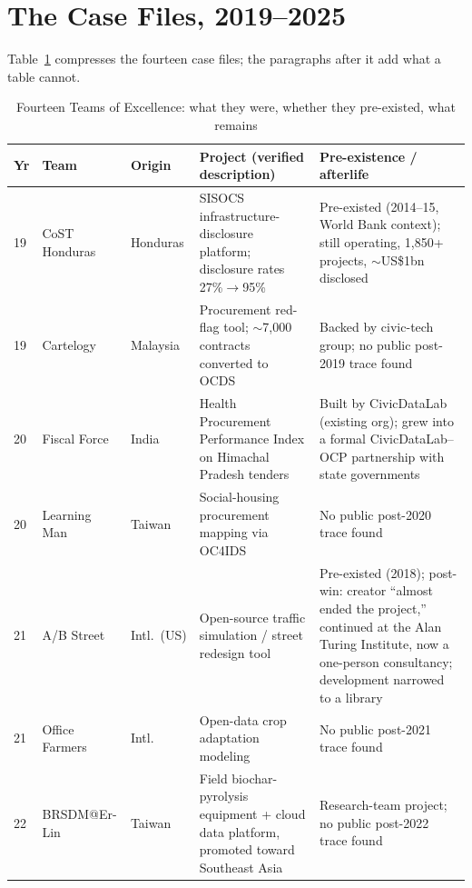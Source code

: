 \section{The Case Files, 2019--2025}\label{sec:cases}

Table~\ref{tab:master} compresses the fourteen case files; the paragraphs
after it add what a table cannot.

\begin{table}[htbp]
\caption{Fourteen Teams of Excellence: what they were, whether they pre-existed, what remains}
\label{tab:master}
\footnotesize
\begin{tabularx}{\textwidth}{@{}p{}p{}p{}Xp{}@{}}
\toprule
\textbf{Yr} & \textbf{Team} & \textbf{Origin} & \textbf{Project (verified description)} & \textbf{Pre-existence / afterlife} \\
\midrule
19 & CoST Honduras & Honduras & SISOCS infrastructure-disclosure platform; disclosure rates 27\%$\to$95\%\cite{cost} & Pre-existed (2014--15, World Bank context); still operating, 1,850+ projects, $\sim$US\$1bn disclosed\cite{cost} \\
19 & Cartelogy & Malaysia & Procurement red-flag tool; $\sim$7,000 contracts converted to OCDS\cite{ocpcartel} & Backed by civic-tech group; no public post-2019 trace found \\
20 & Fiscal Force & India & Health Procurement Performance Index on Himachal Pradesh tenders\cite{ocpfiscal} & Built by CivicDataLab (existing org); grew into a formal CivicDataLab--OCP partnership with state governments\cite{ocpindia} \\
20 & Learning Man & Taiwan & Social-housing procurement mapping via OC4IDS\cite{ocpfiscal} & No public post-2020 trace found \\
21 & A/B Street & Intl.\ (US) & Open-source traffic simulation / street redesign tool\cite{abstreet} & Pre-existed (2018); post-win: creator ``almost ended the project,'' continued at the Alan Turing Institute, now a one-person consultancy; development narrowed to a library\cite{abstreet,abinterview} \\
21 & Office Farmers & Intl. & Open-data crop adaptation modeling\cite{pres2021} & No public post-2021 trace found \\
22 & BRSDM@Er-Lin & Taiwan & Field biochar-pyrolysis equipment + cloud data platform, promoted toward Southeast Asia\cite{hist2023} & Research-team project; no public post-2022 trace found \\

\end{tabularx}
\end{table}
